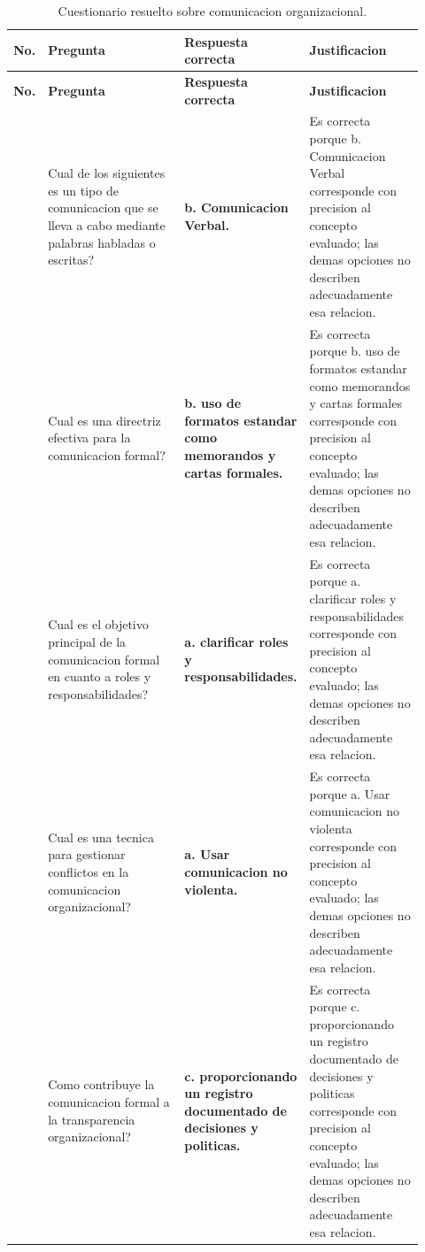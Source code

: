 \documentclass[
	spanish,
	letterpaper, oneside
]{article}
\begin{document}
\clearpage
\pagestyle{empty}
\begin{landscape}
\begingroup
\scriptsize
\setlength{\tabcolsep}{5pt}
\renewcommand{\arraystretch}{1.25}
\begin{longtable}{@{}>{\centering\arraybackslash}p{0.035\linewidth}>{\raggedright\arraybackslash}p{0.40\linewidth}>{\raggedright\arraybackslash}p{0.19\linewidth}>{\raggedright\arraybackslash}p{0.30\linewidth}@{}}
\caption{Cuestionario resuelto sobre comunicacion organizacional.}\label{tab:cuestionario-comunicacion}\\
\toprule
\textbf{No.} & \textbf{Pregunta} & \textbf{Respuesta correcta} & \textbf{Justificacion} \\
\midrule
\endfirsthead
\toprule
\textbf{No.} & \textbf{Pregunta} & \textbf{Respuesta correcta} & \textbf{Justificacion} \\
\midrule
\endhead
\bottomrule
\endfoot
\bottomrule
\endlastfoot
1 & Cual de los siguientes es un tipo de comunicacion que se lleva a cabo mediante palabras habladas o escritas? & \textbf{b. Comunicacion Verbal.} & Es correcta porque b. Comunicacion Verbal corresponde con precision al concepto evaluado; las demas opciones no describen adecuadamente esa relacion. \\
2 & Cual es una directriz efectiva para la comunicacion formal? & \textbf{b. uso de formatos estandar como memorandos y cartas formales.} & Es correcta porque b. uso de formatos estandar como memorandos y cartas formales corresponde con precision al concepto evaluado; las demas opciones no describen adecuadamente esa relacion. \\
3 & Cual es el objetivo principal de la comunicacion formal en cuanto a roles y responsabilidades? & \textbf{a. clarificar roles y responsabilidades.} & Es correcta porque a. clarificar roles y responsabilidades corresponde con precision al concepto evaluado; las demas opciones no describen adecuadamente esa relacion. \\
4 & Cual es una tecnica para gestionar conflictos en la comunicacion organizacional? & \textbf{a. Usar comunicacion no violenta.} & Es correcta porque a. Usar comunicacion no violenta corresponde con precision al concepto evaluado; las demas opciones no describen adecuadamente esa relacion. \\
5 & Como contribuye la comunicacion formal a la transparencia organizacional? & \textbf{c. proporcionando un registro documentado de decisiones y politicas.} & Es correcta porque c. proporcionando un registro documentado de decisiones y politicas corresponde con precision al concepto evaluado; las demas opciones no describen adecuadamente esa relacion. \\

\end{longtable}
\end{landscape}
\end{document}
